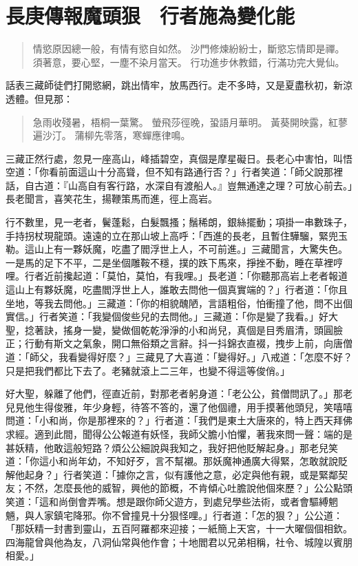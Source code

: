 
\chapter{長庚傳報魔頭狠　行者施為變化能}

\begin{quote}
情慾原因總一般，有情有慾自如然。
沙門修煉紛紛士，斷慾忘情即是禪。
須著意，要心堅，一塵不染月當天。
行功進步休教錯，行滿功完大覺仙。
\end{quote}

話表三藏師徒們打開慾網，跳出情牢，放馬西行。走不多時，又是夏盡秋初，新涼透體。但見那：
\begin{quote}
急雨收殘暑，梧桐一葉驚。
螢飛莎徑晚，蛩語月華明。
黃葵開映露，紅蓼遍沙汀。
蒲柳先零落，寒蟬應律鳴。
\end{quote}

三藏正然行處，忽見一座高山，峰插碧空，真個是摩星礙日。長老心中害怕，叫悟空道：「你看前面這山十分高聳，但不知有路通行否？」行者笑道：「師父說那裡話，自古道：『山高自有客行路，水深自有渡船人。』豈無通達之理？可放心前去。」長老聞言，喜笑花生，揚鞭策馬而進，徑上高岩。

行不數里，見一老者，鬢蓬鬆，白髮飄搔；鬚稀朗，銀絲擺動；項掛一串數珠子，手持拐杖現龍頭。遠遠的立在那山坡上高呼：「西進的長老，且暫住驊騮，緊兜玉勒。這山上有一夥妖魔，吃盡了閻浮世上人，不可前進。」三藏聞言，大驚失色。一是馬的足下不平，二是坐個雕鞍不穩，撲的跌下馬來，掙挫不動，睡在草裡哼哩。行者近前攙起道：「莫怕，莫怕，有我哩。」長老道：「你聽那高岩上老者報道這山上有夥妖魔，吃盡閻浮世上人，誰敢去問他一個真實端的？」行者道：「你且坐地，等我去問他。」三藏道：「你的相貌醜陋，言語粗俗，怕衝撞了他，問不出個實信。」行者笑道：「我變個俊些兒的去問他。」三藏道：「你是變了我看。」好大聖，捻著訣，搖身一變，變做個乾乾淨淨的小和尚兒，真個是目秀眉清，頭圓臉正；行動有斯文之氣象，開口無俗類之言辭。抖一抖錦衣直裰，拽步上前，向唐僧道：「師父，我看變得好麼？」三藏見了大喜道：「變得好。」八戒道：「怎麼不好？只是把我們都比下去了。老豬就滾上二三年，也變不得這等俊俏。」

好大聖，躲離了他們，徑直近前，對那老者躬身道：「老公公，貧僧問訊了。」那老兒見他生得俊雅，年少身輕，待答不答的，還了他個禮，用手摸著他頭兒，笑嘻嘻問道：「小和尚，你是那裡來的？」行者道：「我們是東土大唐來的，特上西天拜佛求經。適到此間，聞得公公報道有妖怪，我師父膽小怕懼，著我來問一聲：端的是甚妖精，他敢這般短路？煩公公細說與我知之，我好把他貶解起身。」那老兒笑道：「你這小和尚年幼，不知好歹，言不幫襯。那妖魔神通廣大得緊，怎敢就說貶解他起身？」行者笑道：「據你之言，似有護他之意，必定與他有親，或是緊鄰契友；不然，怎麼長他的威智，興他的節概，不肯傾心吐膽說他個來歷？」公公點頭笑道：「這和尚倒會弄嘴。想是跟你師父遊方，到處兒學些法術，或者會驅縛魍魎，與人家鎮宅降邪。你不曾撞見十分狠怪哩。」行者道：「怎的狠？」公公道：「那妖精一封書到靈山，五百阿羅都來迎接；一紙簡上天宮，十一大曜個個相欽。四海龍曾與他為友，八洞仙常與他作會；十地閻君以兄弟相稱，社令、城隍以賓朋相愛。」


